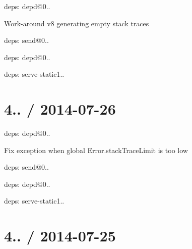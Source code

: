 {\ttfamily }

{\ttfamily 
\begin{DoxyItemize}
\item deps\+: depd@0..
\begin{DoxyItemize}
\item Work-\/around v8 generating empty stack traces
\end{DoxyItemize}
\item deps\+: send@0..
\begin{DoxyItemize}
\item deps\+: depd@0..
\end{DoxyItemize}
\item deps\+: serve-\/static1..
\end{DoxyItemize}}

{\ttfamily \section*{4.. / 2014-\/07-\/26 }}

{\ttfamily }

{\ttfamily 
\begin{DoxyItemize}
\item deps\+: depd@0..
\begin{DoxyItemize}
\item Fix exception when global {\ttfamily Error.\+stack\+Trace\+Limit} is too low
\end{DoxyItemize}
\item deps\+: send@0..
\begin{DoxyItemize}
\item deps\+: depd@0..
\end{DoxyItemize}
\item deps\+: serve-\/static1..
\end{DoxyItemize}}

{\ttfamily \section*{4.. / 2014-\/07-\/25 }}

{\ttfamily }

